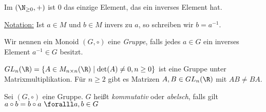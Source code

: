 \begin{exmp*}
	Im $ (\N_{\geq 0},+) $ ist 0 das einzige Element, das ein inverses Element hat.
\end{exmp*}

\underline{Notation:} Ist $ a \in M $ und $ b \in M $ invers zu $a$, so schreiben wir $ b = a^{-1} $.

\begin{defn*}[Gruppe]
	Wir nennen ein Monoid $ (G,\circ) $ eine \emph{Gruppe}, falls jedes $ a \in G $ ein inverses Element $ a^{-1} \in G $ besitzt.
\end{defn*}

\begin{exmp*}
	$ GL_n(\R) = \{A \in M_{n \times n} (\R) \mid \det(A) \neq 0, n \geq 0\} $ ist eine Gruppe unter Matrixmultiplikation. Für $ n \geq 2 $ gibt es Matrizen $ A,B \in GL_n(\R) $ mit $ AB \neq BA $.
\end{exmp*}

\begin{defn*}
	Sei $ (G,\circ) $ eine Gruppe. $G$ heißt \emph{kommutativ} oder \emph{abelsch}, falls gilt $ a \circ b = b \circ a \ \foralll a,b \in G $
\end{defn*}